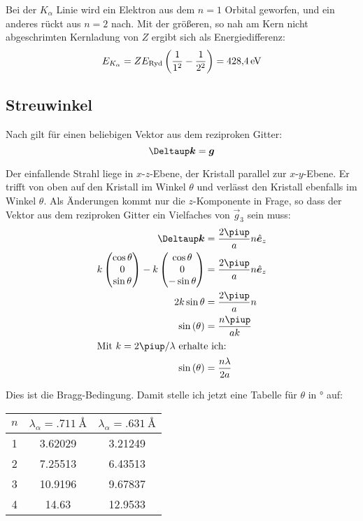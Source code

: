 Bei der $K_\alpha$ Linie wird ein Elektron aus dem $n=1$ Orbital geworfen, und
ein anderes rückt aus $n=2$ nach. Mit der größeren, so nah am Kern nicht
abgeschrimten Kernladung von $Z$ ergibt sich als Energiedifferenz:
\[
	E_{K_\alpha} = Z E_\text{Ryd} \del{\frac1{1^2} - \frac1{2^2}}
	= \SI{428.4}\electronvolt
\]

\subsection{Streuwinkel}

Nach \cite[Seite 862]{meschede-gerthsen_24} gilt für einen beliebigen Vektor aus dem reziproken Gitter:
\[
	\Deltaup \vec k = \vec g
\]

Der einfallende Strahl liege in $x$-$z$-Ebene, der Kristall parallel zur
$x$-$y$-Ebene. Er trifft von oben auf den Kristall im Winkel $\theta$ und
verlässt den Kristall ebenfalls im Winkel $\theta$. Als Änderungen kommt nur
die $z$-Komponente in Frage, so dass der Vektor aus dem reziproken Gitter ein
Vielfaches von $\vec g_3$ sein muss:
\begin{align*}
	\Deltaup \vec k &= \frac{2\piup}a n \ev_z \\
	k \begin{pmatrix}
		\cos\theta \\ 0 \\ \sin\theta
	\end{pmatrix} - k \begin{pmatrix}
		\cos\theta \\ 0 \\ - \sin\theta
	\end{pmatrix} &= \frac{2\piup}a n \ev_z \\
		2k \sin\theta &= \frac{2\piup}a n \\
		\sin\del\theta &= \frac{n\piup}{ak} \\
		\intertext{%
			Mit $k = 2\piup/\lambda$ erhalte ich:
		}
		\sin\del\theta &= \frac{n\lambda}{2a}
\end{align*}

Dies ist die Bragg-Bedingung. Damit stelle ich jetzt eine Tabelle für $\theta$
in $\si\degree$ auf:
\begin{center}
	\begin{tabular}{S|SS}
		{$n$} & {$\lambda_\alpha = \SI{.711}\angstrom$} & {$\lambda_\alpha = \SI{.631}\angstrom$} \\
		 & 3.62029 & 3.21249 \\
		2 & 7.25513 & 6.43513 \\
		3 & 10.9196 & 9.67837 \\
		4 & 14.63 & 12.9533 \\
	\end{tabular}
\end{center}

